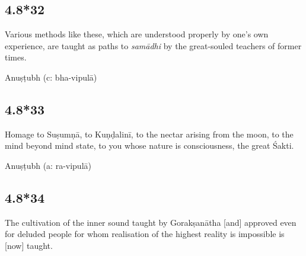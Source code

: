\begin{ekdosis}
\subsection*{4.8*32}
\begin{translation}[hp04_008_32]
Various methods like these, which are understood properly by one's own experience, are taught as paths to \textit{samādhi} by the great-souled teachers of former times.
\end{translation}




\begin{metre}[hp04_008_32]
Anuṣṭubh (c: bha-vipulā)
\end{metre}

\subsection*{4.8*33}
\begin{translation}[hp04_008_33]
Homage to Suṣumṇā, to Kuṇḍalinī, to the nectar arising from the moon, to the mind beyond mind state, to you whose nature is consciousness, the great Śakti.%
\end{translation}




\begin{metre}[hp04_008_33]
Anuṣṭubh (a: ra-vipulā)
\end{metre}

\subsection*{4.8*34}
\begin{translation}[hp04_008_34]
The cultivation of the inner sound taught by Gorakṣanātha [and] approved even for deluded people for whom realisation of the highest reality is impossible is [now] taught.
\end{translation} %


\end{ekdosis}
